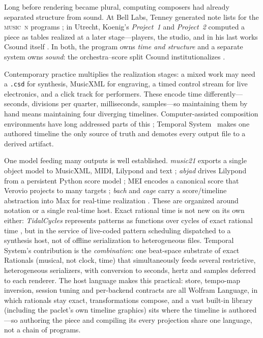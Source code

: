 \documentclass[runningheads,a4paper]{llncs}
\begin{document}
Long before rendering became plural, computing composers had already separated
structure from sound. At Bell Labs, Tenney generated note lists for the
\textsc{music~n} programs \cite{tenney,mathews}; in Utrecht, Koenig's
\emph{Project~1} and \emph{Project~2} computed a piece as tables realized at a
later stage---players, the studio, and in his last works Csound itself
\cite{koenig}. In both, the program owns \emph{time and structure} and a
separate system owns \emph{sound}: the orchestra--score split Csound
institutionalizes \cite{csoundbook}.

Contemporary practice multiplies the realization stages: a mixed work may need
a \texttt{.csd} for synthesis, MusicXML for engraving, a timed control stream
for live electronics, and a click track for performers. These encode time
differently---seconds, divisions per quarter, milliseconds, samples---so
maintaining them by hand means maintaining four diverging timelines.
Computer-assisted composition environments have long addressed parts of this
\cite{openmusic,taube}; Temporal System~\cite{wolfram} makes one authored
timeline the only source of truth and demotes every output file to a derived
artifact.

One model feeding many outputs is well established. \emph{music21} exports a
single object model to MusicXML, MIDI, Lilypond and text \cite{music21};
\emph{abjad} drives Lilypond from a persistent Python score model
\cite{abjad}; MEI encodes a canonical score that Verovio projects to many
targets \cite{mei,verovio}; \emph{bach} and \emph{cage} carry a
score/timeline abstraction into Max for real-time realization \cite{bach}.
These are organized around notation or a single real-time host. Exact
rational time is not new on its own either: \emph{TidalCycles} represents
patterns as functions over cycles of exact rational time \cite{tidal}, but in
the service of live-coded pattern scheduling dispatched to a synthesis host,
not of offline serialization to heterogeneous files. Temporal System's
contribution is the \emph{combination}: one beat-space substrate of exact
Rationals (musical, not clock, time) that simultaneously feeds several
restrictive, heterogeneous serializers, with conversion to seconds, hertz and
samples deferred to each renderer. The host language makes
this practical: store, tempo-map inversion, session tuning and per-backend
contracts are all Wolfram Language, in which rationals stay exact,
transformations compose, and a vast built-in library (including the paclet's own
timeline graphics) sits where the timeline is authored---so authoring the piece
and compiling its every projection share one language, not a chain of programs.
\end{document}
